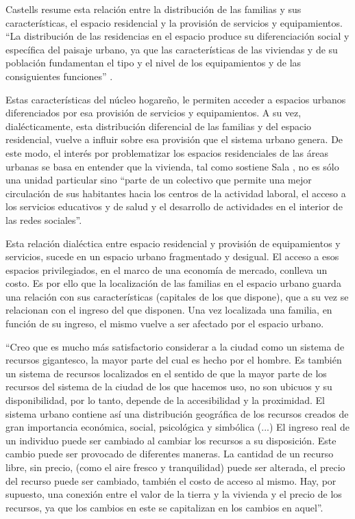 Castells resume esta relación entre la distribución de las familias y sus características, el espacio residencial y la provisión de servicios y equipamientos. “La distribución de las residencias en el espacio produce su diferenciación social y específica del paisaje urbano, ya que las características de las viviendas y de su población fundamentan el tipo y el nivel de los equipamientos y de las consiguientes funciones” \cite[p.~203]{castells}.

Estas características del núcleo hogareño, le permiten acceder a espacios urbanos diferenciados por esa provisión de servicios y equipamientos. A su vez, dialécticamente, esta distribución diferencial de las familias y del espacio residencial, vuelve a influir sobre esa provisión que el sistema urbano genera. De este modo, el interés por problematizar los espacios residenciales de las áreas urbanas se basa en entender que la vivienda, tal como sostiene Sala \citeyear{sala}, no es sólo una unidad particular sino “parte de un colectivo que permite una mejor circulación de sus habitantes hacia los centros de la actividad laboral, el acceso a los servicios educativos y de salud y el desarrollo de actividades en el interior de las redes sociales”.

Esta relación dialéctica entre espacio residencial y provisión de equipamientos y servicios, sucede en un espacio urbano fragmentado y desigual. El acceso a esos espacios privilegiados, en el marco de una economía de mercado, conlleva un costo. Es por ello que la localización de las familias en el espacio urbano guarda una relación con sus características (capitales de los que dispone), que a su vez se relacionan con el ingreso del que disponen. Una vez localizada una familia, en función de su ingreso, el mismo  vuelve a ser afectado por el espacio urbano.

“Creo que es mucho más satisfactorio considerar a la ciudad como un sistema de recursos gigantesco, la mayor parte del cual es hecho por el hombre. Es también un sistema de recursos localizados en el sentido de que la mayor parte de los recursos del sistema de la ciudad de los que hacemos uso, no son ubicuos y su disponibilidad, por lo tanto, depende de la accesibilidad y la proximidad. El sistema urbano contiene así una distribución geográfica de los recursos creados de gran importancia económica, social, psicológica y simbólica (...) El ingreso real de un individuo puede ser cambiado al cambiar los recursos a su disposición. Este cambio puede ser provocado de diferentes maneras. La cantidad de un recurso libre, sin precio, (como el aire fresco y tranquilidad) puede ser alterada, el precio del recurso puede ser cambiado, también el costo de acceso al mismo. Hay, por supuesto, una conexión entre el valor de la tierra y la vivienda y el precio de los recursos, ya que los cambios en este se capitalizan en los cambios en aquel”\cite[~68]{harvey}.

